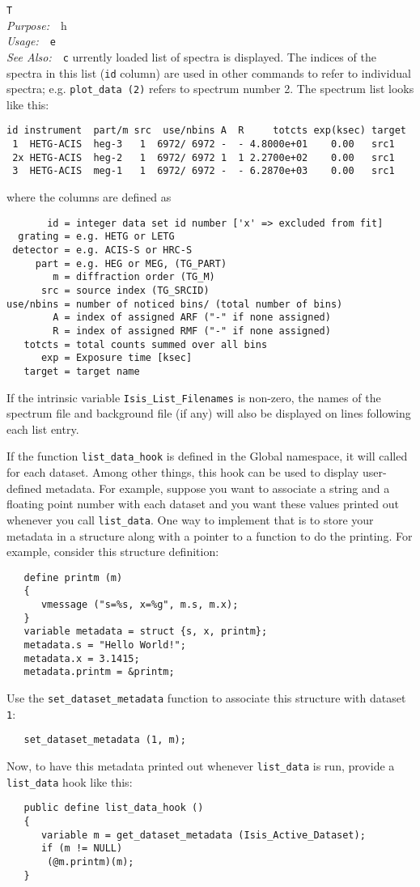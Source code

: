 \documentclass{book}
\makeatletter
\newif\ifpdf
\newenvironment{isisfunction}[4]%
{\index{{#1}@{\tt #1}}%
  \ifpdf
  \else
     \addcontentsline{toc}{subsection}{{#1} -- {#2}}
  \fi
  \vbox{
          \vspace*{\baselineskip}
          {\LARGE\tt #1}\vspace*{\baselineskip}\\
          {{\it Purpose:}~~{#2}}\\
          {{\it Usage:}~~{\tt #3}}\\
          {{\it See Also:}~~{\tt #4}}
       }
}%
{ }
\makeatother
\begin{document}
{\begin{isisfunction}
The currently loaded list of spectra is displayed.  The indices of
the spectra in this list ({\tt id} column) are used in other
commands to refer to individual spectra; e.g. {\tt plot\_data (2)}
refers to spectrum number 2.  The spectrum list looks like this:
\begin{verbatim}
id instrument  part/m src  use/nbins A  R     totcts exp(ksec) target
 1  HETG-ACIS  heg-3   1  6972/ 6972 -  - 4.8000e+01    0.00   src1
 2x HETG-ACIS  heg-2   1  6972/ 6972 1  1 2.2700e+02    0.00   src1
 3  HETG-ACIS  meg-1   1  6972/ 6972 -  - 6.2870e+03    0.00   src1
\end{verbatim}
where the columns are defined as
\begin{verbatim}
       id = integer data set id number ['x' => excluded from fit]
  grating = e.g. HETG or LETG
 detector = e.g. ACIS-S or HRC-S
     part = e.g. HEG or MEG, (TG_PART)
        m = diffraction order (TG_M)
      src = source index (TG_SRCID)
use/nbins = number of noticed bins/ (total number of bins)
        A = index of assigned ARF ("-" if none assigned)
        R = index of assigned RMF ("-" if none assigned)
   totcts = total counts summed over all bins
      exp = Exposure time [ksec]
   target = target name
\end{verbatim}

If the intrinsic variable \verb|Isis_List_Filenames| is non-zero,
the names of the spectrum file and background file (if any) will
also be displayed on lines following each list entry.

If the function \verb|list_data_hook| is defined in the Global
namespace, it will called for each dataset.  Among other
things, this hook can be used to display user-defined metadata.
For example, suppose you want to associate a string and a
floating point number with each dataset and you want these
values printed out whenever you call \verb|list_data|.  One way
to implement that is to store your metadata in a structure
along with a pointer to a function to do the printing. For
example, consider this structure definition:
\begin{verbatim}
   define printm (m)
   {
      vmessage ("s=%s, x=%g", m.s, m.x);
   }
   variable metadata = struct {s, x, printm};
   metadata.s = "Hello World!";
   metadata.x = 3.1415;
   metadata.printm = &printm;
\end{verbatim}
Use the \verb|set_dataset_metadata| function to associate this
structure with dataset \verb|1|:
\begin{verbatim}
   set_dataset_metadata (1, m);
\end{verbatim}
Now, to have this metadata printed out whenever \verb|list_data|
is run, provide a \verb|list_data| hook like this:
\begin{verbatim}
   public define list_data_hook ()
   {
      variable m = get_dataset_metadata (Isis_Active_Dataset);
      if (m != NULL)
       (@m.printm)(m);
   }
\end{verbatim}


\end{isisfunction}}
\end{document}
